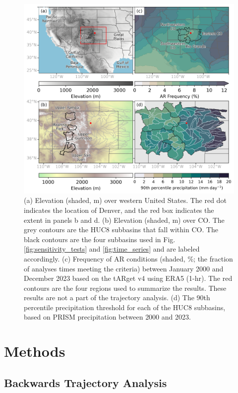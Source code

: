 \documentclass[draft]{agujournal2019}
\begin{document}
\begin{figure}
\noindent\includegraphics[width=\textwidth, height=\textheight, keepaspectratio]{fig1.png}
\caption{(a) Elevation (shaded, m) over western United States. The red dot indicates the location of Denver, and the red box indicates the extent in panels b and d. (b) Elevation (shaded, m) over CO. The grey contours are the HUC8 subbasins that fall within CO. The black contours are the four subbasins used in Fig. \ref{fig:sensitivity_tests} and \ref{fig:time_series} and are labeled accordingly. (c) Frequency of AR conditions (shaded, \%; the fraction of analyses times meeting the criteria) between January 2000 and December 2023 based on the  tARget v4 using ERA5 (1-hr). The red contours are the four regions used to summarize the results. These results are not a part of the trajectory analysis. (d) The 90th percentile precipitation threshold for each of the HUC8 subbasins, based on PRISM precipitation between 2000 and 2023.}
\label{fig:elevation}
\end{figure}


\section{Methods}
\label{sec:methods}
\subsection{Backwards Trajectory Analysis}
\end{document}
